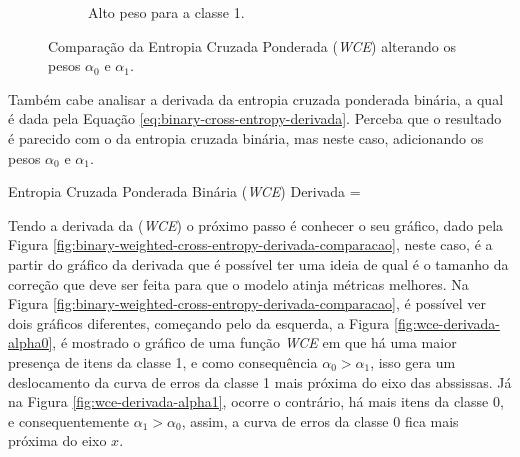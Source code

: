 \begin{figure}[h!]
\begin{subfigure}[b]{0.48\textwidth}
        \caption{Alto peso para a classe 1.}
        \label{fig:comparativo-entropia-cruzada-ponderada-binaria-com-alto-peso-para-classe-1}
    \end{subfigure}
    
    \caption{Comparação da Entropia Cruzada Ponderada (\textit{WCE}) alterando os pesos $\alpha_0$ e $\alpha_1$.}
    \label{fig:comparativo-entropia-cruzada-ponderada-binaria}
\end{figure}

Também cabe analisar a derivada da entropia cruzada ponderada binária, a qual é dada pela Equação \ref{eq:binary-cross-entropy-derivada}. Perceba que o resultado é parecido com o da entropia cruzada binária, mas neste caso, adicionando os pesos $\alpha_0$ e $\alpha_1$.

\begin{equacaodestaque}{Entropia Cruzada Ponderada Binária (\textit{WCE}) Derivada}
     = 
    \label{eq:binary-weighted-cross-entropy-derivada}
\end{equacaodestaque}

Tendo a derivada da (\textit{WCE}) o próximo passo é conhecer o seu gráfico, dado pela Figura \ref{fig:binary-weighted-cross-entropy-derivada-comparacao}, neste caso, é a partir do gráfico da derivada que é possível ter uma ideia de qual é o tamanho da correção que deve ser feita para que o modelo atinja métricas melhores. Na Figura \ref{fig:binary-weighted-cross-entropy-derivada-comparacao}, é possível ver dois gráficos diferentes, começando pelo da esquerda, a Figura \ref{fig:wce-derivada-alpha0}, é mostrado o gráfico de uma função \textit{WCE} em que há uma maior presença de itens da classe 1, e como consequência $\alpha_0 > \alpha_1$, isso gera um deslocamento da curva de erros da classe 1 mais próxima do eixo das abssissas. Já na Figura \ref{fig:wce-derivada-alpha1}, ocorre o contrário, há mais itens da classe 0, e consequentemente $\alpha_1 > \alpha_0$, assim, a curva de erros da classe 0 fica mais próxima do eixo $x$.

